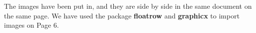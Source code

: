 \documentclass[a4paper, 11pt]{article}
\begin{document}
\begin{figure}[H]
\begin{floatrow}
	\hspace{-0.4cm}
\end{floatrow}
\end{figure}

The images have been put in, and they are side by side in the same document on the same page. We have used the package \textbf{floatrow} and \textbf{graphicx} to import images on Page 6.
\end{document}
